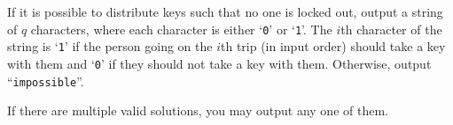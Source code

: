 
	If it is possible to distribute keys such that no one is locked out, output
	a string of $q$ characters,
	where each character is either `\texttt{0}' or `\texttt{1}'.
	The $i$th character of the string is `\texttt{1}' if the
	person going on the $i$th trip (in input order) should take a key with them and `\texttt{0}'
	if they should not take a key with them. Otherwise, output ``\texttt{impossible}''.

	If there are multiple valid solutions, you may output any one of them.
